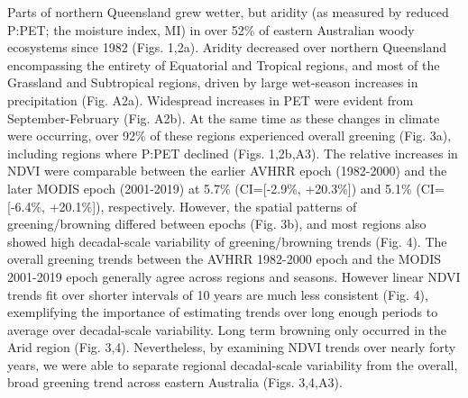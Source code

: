 \documentclass[
]{article}
\begin{document}
Parts of northern Queensland grew wetter, but aridity (as measured by
reduced P:PET; the moisture index, MI) in over 52\% of eastern
Australian woody ecosystems since 1982 (Figs. 1,2a). Aridity decreased
over northern Queensland encompassing the entirety of Equatorial and
Tropical regions, and most of the Grassland and Subtropical regions,
driven by large wet-season increases in precipitation (Fig. A2a).
Widespread increases in PET were evident from September-February (Fig.
A2b). At the same time as these changes in climate were occurring, over
92\% of these regions experienced overall greening (Fig. 3a), including
regions where P:PET declined (Figs. 1,2b,A3). The relative increases in
NDVI were comparable between the earlier AVHRR epoch (1982-2000) and the
later MODIS epoch (2001-2019) at 5.7\% (CI={[}-2.9\%, +20.3\%{]}) and
5.1\% (CI={[}-6.4\%, +20.1\%{]}), respectively. However, the spatial
patterns of greening/browning differed between epochs (Fig. 3b), and
most regions also showed high decadal-scale variability of
greening/browning trends (Fig. 4). The overall greening trends between
the AVHRR 1982-2000 epoch and the MODIS 2001-2019 epoch generally agree
across regions and seasons. However linear NDVI trends fit over shorter
intervals of 10 years are much less consistent (Fig. 4), exemplifying
the importance of estimating trends over long enough periods to average
over decadal-scale variability. Long term browning only occurred in the
Arid region (Fig. 3,4). Nevertheless, by examining NDVI trends over
nearly forty years, we were able to separate regional decadal-scale
variability from the overall, broad greening trend across eastern
Australia (Figs. 3,4,A3).
\end{document}
